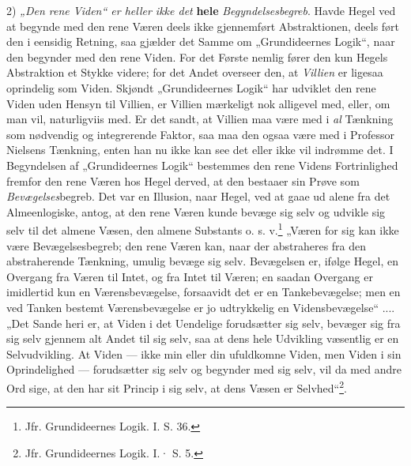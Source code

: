 \documentclass[12pt,a4paper]{book}
\newcommand{\opage}[1]{\marginnote{\footnotesize\textit{[#1]}}}
\begin{document}
2) \emph{„Den rene Viden“ er heller ikke det}
\textbf{hele} \emph{Begyndelsesbegreb}. Havde Hegel ved at begynde
med den rene Væren deels ikke gjennemført Abstraktionen,
deels ført den i eensidig Retning, saa gjælder
det Samme om „Grundideernes Logik“, naar den
begynder med den rene Viden. For det Første nemlig
fører den kun Hegels Abstraktion et Stykke videre; for
det Andet overseer den, at \emph{Villien} er ligesaa oprindelig
som Viden. Skjøndt „Grundideernes Logik“ har udviklet
den rene Viden uden Hensyn til Villien, er Villien
mærkeligt nok alligevel med, eller, om man vil, naturligviis
med. Er det sandt, at Villien maa være med i
\emph{al} Tænkning som nødvendig og integrerende Faktor, saa
maa den ogsaa være med i Professor Nielsens Tænkning,
enten han nu ikke kan see det eller ikke vil indrømme
det. I Begyndelsen af „Grundideernes Logik“
bestemmes den rene Videns Fortrinlighed fremfor den
rene Væren hos Hegel derved, at den bestaaer sin
Prøve som \emph{Bevægelses}begreb. Det var en Illusion,
naar Hegel, ved at gaae ud alene fra det Almeenlogiske,
antog, at den rene Væren kunde bevæge sig selv og
udvikle sig selv til det almene Væsen, den almene Substants
o. s. v.\footnote{Jfr. Grundideernes Logik. I. S. 36.} „Væren for sig kan ikke være Bevægelsesbegreb;
den rene Væren kan, naar der abstraheres
\opage{67}\setcounter{footnote}{0}%
fra den abstraherende Tænkning, umulig bevæge sig selv.
Bevægelsen er, ifølge Hegel, en Overgang fra Væren til
Intet, og fra Intet til Væren; en saadan Overgang er
imidlertid kun en Værensbevægelse, forsaavidt det er en
Tankebevægelse; men en ved Tanken bestemt Værensbevægelse
er jo udtrykkelig en Vidensbevægelse“ .... „Det
Sande heri er, at Viden i det Uendelige forudsætter sig
selv, bevæger sig fra sig selv gjennem alt Andet til sig
selv, saa at dens hele Udvikling væsentlig er en Selvudvikling.
At Viden --- ikke min eller din ufuldkomne
Viden, men Viden i sin Oprindelighed --- forudsætter
sig selv og begynder med sig selv, vil da med andre
Ord sige, at den har sit Princip i sig selv, at dens
Væsen er Selvhed“\footnote{Jfr. Grundideernes Logik. I.· S. 5.}.
\end{document}

